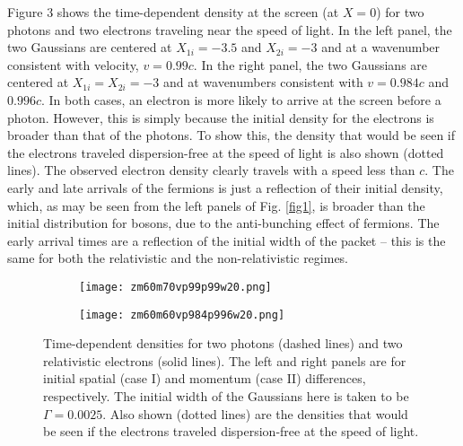 \documentclass[preprint,aps]{revtex4}
\begin{document}
Figure 3 shows the time-dependent density at the screen (at $X=0$) for two photons and two electrons traveling near the speed of light.  In the left panel, the two Gaussians are centered at $X_{1i}=-3.5$ and $X_{2i}=-3$ and at a wavenumber consistent with velocity, $v=0.99c$.  In the right panel, the two Gaussians are centered at $X_{1i}=X_{2i}=-3$ and at wavenumbers consistent with $v=0.984c$ and $0.996c$.  In both cases, an electron is more likely to arrive at the screen before a photon.  However, this is simply because the initial density for the electrons is broader than that of the photons.  To show this, the density that would be seen if the electrons traveled dispersion-free at the speed of light is also shown (dotted lines).  The observed electron density clearly travels with a speed less than $c$. The early and late arrivals of the fermions is just a reflection of their initial density, which, as may be seen from the left panels of Fig. \ref{fig1}, is broader than the initial distribution for bosons, due to the anti-bunching effect of fermions. The early arrival times are a reflection of the initial width of the packet -- this is the same for both the relativistic and the non-relativistic regimes.

\begin{figure}
	\begin{subfigure}[t]{0.45\textwidth}
		\texttt{[image: zm60m70vp99p99w20.png]}
		\label{fig3a}
	\end{subfigure}
	\hfill
	\begin{subfigure}[t]{0.45\textwidth}
		\texttt{[image: zm60m60vp984p996w20.png]}
		\label{fig3b}
	\end{subfigure}
	
	
\caption{\noindent Time-dependent densities for two photons (dashed lines) and two relativistic electrons (solid lines). The left and right panels are for initial spatial (case I) and momentum (case II) differences, respectively. The initial width of the Gaussians here is taken to be $\Gamma=0.0025$. Also shown (dotted lines) are the densities that would be seen if the electrons traveled dispersion-free at the speed of light.} \label{fig3}
\end{figure}
\end{document}
